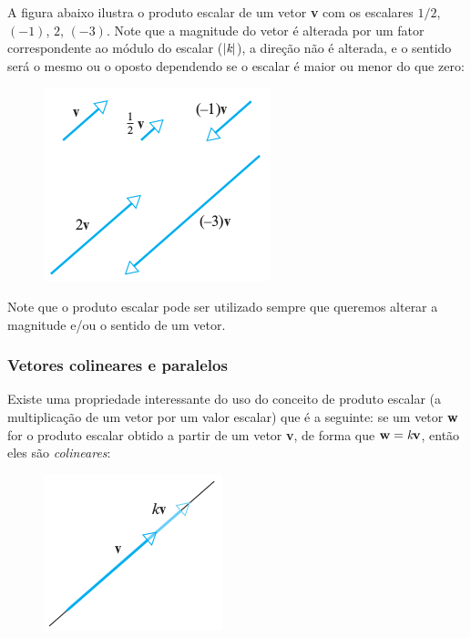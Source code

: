 \documentclass[pdftex, brazil, 12pt, twoside]{article}
\newcommand{\vet}[1]{\textbf{#1}}
\newcommand{\esc}[1]{\emph{#1}}
\begin{document}
A figura abaixo ilustra o produto escalar de um vetor \vet{v} com os escalares
$1/2$, $(-1)$, $2$, $(-3)$. Note que a magnitude do vetor é alterada por um fator
correspondente ao módulo do escalar ($|\esc{k}|$), a direção não é alterada,
e o sentido será o mesmo ou o oposto dependendo se o escalar é maior ou menor
do que zero:

\begin{figure}[H]
  \begin{center}
    \includegraphics[scale=0.6]{imagens/vet012.png}
  \end{center}
\end{figure}

Note que o produto escalar pode ser utilizado sempre que queremos alterar
a magnitude e/ou o sentido de um vetor.

\subsubsection{Vetores colineares e paralelos}
\label{evd-geom-bi-tri-n-dimen-paralelos}

Existe uma propriedade interessante do uso do conceito de produto escalar (a
multiplicação de um vetor por um valor escalar) que é a seguinte: se um vetor
\vet{w} for o produto escalar obtido a partir de um vetor \vet{v}, de forma que 
$\vet{w} = \esc{k}\vet{v}$, então eles são \emph{colineares}:

\begin{figure}[H]
  \begin{center}
    \includegraphics[scale=0.6]{imagens/vet013.png}
  \end{center}
\end{figure}
\end{document}
